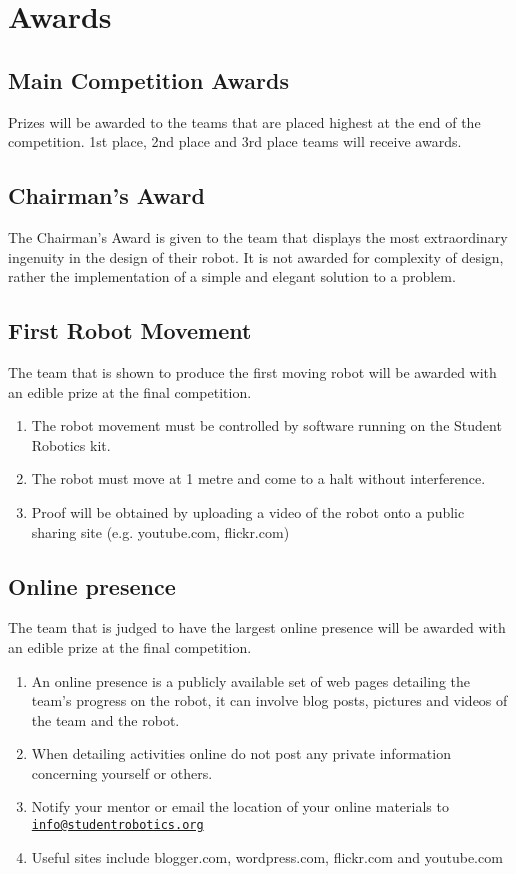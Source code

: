 \section {Awards}
\label{sec:Awards}

\subsection{Main Competition Awards}
Prizes will be awarded to the teams that are placed highest at the end of the competition. 1st place, 2nd place and 3rd place teams will receive awards.

\subsection{Chairman's Award}
The Chairman's Award is given to the team that displays the most extraordinary ingenuity in the design of their robot. It is not awarded for complexity of design, rather the implementation of a simple and elegant solution to a problem.

\subsection{First Robot Movement}
The team that is shown to produce the first moving robot will be awarded with an edible prize at the final competition.
\begin{enumerate}
\item The robot movement must be controlled by software running on the Student Robotics kit.
\item The robot must move at 1 metre and come to a halt without interference.
\item Proof will be obtained by uploading a video of the robot onto a public sharing site (e.g. youtube.com, flickr.com)
\end{enumerate}


\subsection{Online presence} 
The team that is judged to have the largest online presence will be awarded with an edible prize at the final competition.
\begin{enumerate}
\item An online presence is a publicly available set of web pages detailing the team's progress on the robot, it can involve blog posts, pictures and videos of the team and the robot.
\item When detailing activities online do not post any private information concerning yourself or others.
\item Notify your mentor or email the location of your online materials to \href{mailto:info@studentrobotics.org}{\nolinkurl{info@studentrobotics.org}}
\item Useful sites include blogger.com, wordpress.com, flickr.com and youtube.com
\end{enumerate}
